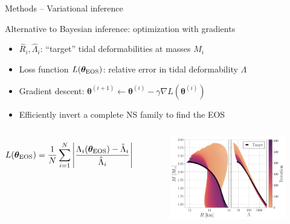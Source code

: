 \documentclass[usenames,dvipsnames,t]{beamer}
\newcommand{\thetaeos}{\boldsymbol{\theta}_{\rm{EOS}}}
\newcommand{\boldtheta}{\boldsymbol{\theta}}
\begin{document}
\begin{frame}{Methods -- Variational inference}

  \def\x{2mm}

  Alternative to Bayesian inference: optimization with gradients


  \begin{itemize}
    \vspace{\x}

    \item $\hat{R}_i, \hat{\Lambda}_i$: ``target'' tidal deformabilities at masses $M_i$

    \vspace{\x}
    
    \item Loss function $L(\thetaeos)$: relative error in tidal deformability $\Lambda$
    
    \vspace{\x}

    \item Gradient descent: $\boldtheta^{(i+1)} \leftarrow \boldtheta^{(i)} - \gamma \nabla L(\boldtheta^{(i)})$

    \vspace{\x}

    \item Efficiently invert a complete NS family to find the EOS
  \end{itemize}

  \vspace{-3mm}

  \begin{columns}


    \begin{equation*}
      L(\thetaeos) = \frac1N \sum_{i=1}^N \left| \frac{\Lambda_i(\thetaeos) - \hat{\Lambda}_i}{\hat{\Lambda}_i} \right|
    \end{equation*}


    \begin{figure}[htpb]
      \centering
      \includegraphics[width=1.0\linewidth]{Figures/showcase_variational_inference.pdf}
    \end{figure}


\end{columns}
\end{frame}
\end{document}
